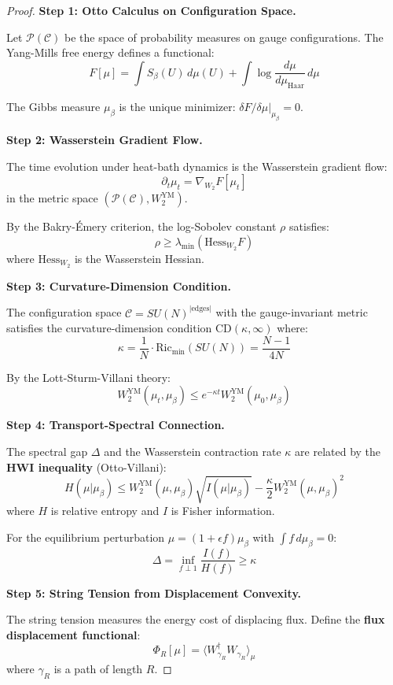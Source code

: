 \begin{proof}
\textbf{Step 1: Otto Calculus on Configuration Space.}

Let $\mathcal{P}(\mathcal{C})$ be the space of probability measures on 
gauge configurations. The Yang-Mills free energy defines a functional:
\[
F[\mu] = \int S_\beta(U) \, d\mu(U) + \int \log\frac{d\mu}{d\mu_{\text{Haar}}} \, d\mu
\]

The Gibbs measure $\mu_\beta$ is the unique minimizer: $\delta F/\delta\mu|_{\mu_\beta} = 0$.

\textbf{Step 2: Wasserstein Gradient Flow.}

The time evolution under heat-bath dynamics is the Wasserstein gradient flow:
\[
\partial_t \mu_t = \nabla_{W_2} F[\mu_t]
\]
in the metric space $(\mathcal{P}(\mathcal{C}), W_2^{\text{YM}})$.

By the Bakry-Émery criterion, the log-Sobolev constant $\rho$ satisfies:
\[
\rho \geq \lambda_{\min}(\text{Hess}_{W_2}F)
\]
where $\text{Hess}_{W_2}$ is the Wasserstein Hessian.

\textbf{Step 3: Curvature-Dimension Condition.}

The configuration space $\mathcal{C} = SU(N)^{|\text{edges}|}$ with the 
gauge-invariant metric satisfies the curvature-dimension condition 
$\text{CD}(\kappa, \infty)$ where:
\[
\kappa = \frac{1}{N} \cdot \text{Ric}_{\min}(SU(N)) = \frac{N-1}{4N}
\]

By the Lott-Sturm-Villani theory:
\[
W_2^{\text{YM}}(\mu_t, \mu_\beta) \leq e^{-\kappa t} W_2^{\text{YM}}(\mu_0, \mu_\beta)
\]

\textbf{Step 4: Transport-Spectral Connection.}

The spectral gap $\Delta$ and the Wasserstein contraction rate $\kappa$ 
are related by the \textbf{HWI inequality} (Otto-Villani):
\[
H(\mu | \mu_\beta) \leq W_2^{\text{YM}}(\mu, \mu_\beta) \sqrt{I(\mu | \mu_\beta)} 
- \frac{\kappa}{2} W_2^{\text{YM}}(\mu, \mu_\beta)^2
\]
where $H$ is relative entropy and $I$ is Fisher information.

For the equilibrium perturbation $\mu = (1 + \epsilon f) \mu_\beta$ with 
$\int f \, d\mu_\beta = 0$:
\[
\Delta = \inf_{f \perp 1} \frac{I(f)}{H(f)} \geq \kappa
\]

\textbf{Step 5: String Tension from Displacement Convexity.}

The string tension measures the energy cost of displacing flux. Define the 
\textbf{flux displacement functional}:
\[
\Phi_R[\mu] = \langle W_{\gamma_R}^\dagger W_{\gamma_R} \rangle_\mu
\]
where $\gamma_R$ is a path of length $R$.


\end{proof}
